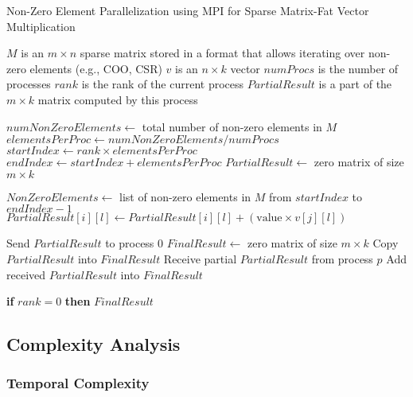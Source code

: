 \documentclass[12pt,oneside]{book} %
\begin{document}
\begin{algorithm}
    \caption{Non-Zero Element Parallelization using MPI for Sparse Matrix-Fat Vector Multiplication}
    \begin{algorithmic}
        \Require $M$ is an $m \times n$ sparse matrix stored in a format that allows iterating over non-zero elements (e.g., COO, CSR)
        \Require $v$ is an $n \times k$ vector
        \Require $numProcs$ is the number of processes
        \Require $rank$ is the rank of the current process
        \Ensure  $PartialResult$ is a part of the $m \times k$ matrix computed by this process

        \State $numNonZeroElements \gets$ total number of non-zero elements in $M$
        \State $elementsPerProc \gets numNonZeroElements / numProcs$
        \State $startIndex \gets rank \times elementsPerProc$
        \State $endIndex \gets startIndex + elementsPerProc$
        \State $PartialResult \gets$ zero matrix of size $m \times k$

        \State $NonZeroElements \gets$ list of non-zero elements in $M$ from $startIndex$ to $endIndex - 1$
        \State $PartialResult[i][l] \gets PartialResult[i][l] + (\text{value} \times v[j][l])$
        \EndFor
        \EndFor

        \State Send $PartialResult$ to process $0$
        \Else
        \State $FinalResult \gets$ zero matrix of size $m \times k$
        \State Copy $PartialResult$ into $FinalResult$
        \State Receive partial $PartialResult$ from process $p$
        \State Add received $PartialResult$ into $FinalResult$
        \EndFor
        \EndIf

        \State \textbf{if} $rank = 0$ \textbf{then} \Return $FinalResult$
    \end{algorithmic}
\end{algorithm}

\subsection{Complexity Analysis}
\subsubsection{Temporal Complexity}
\end{document}
